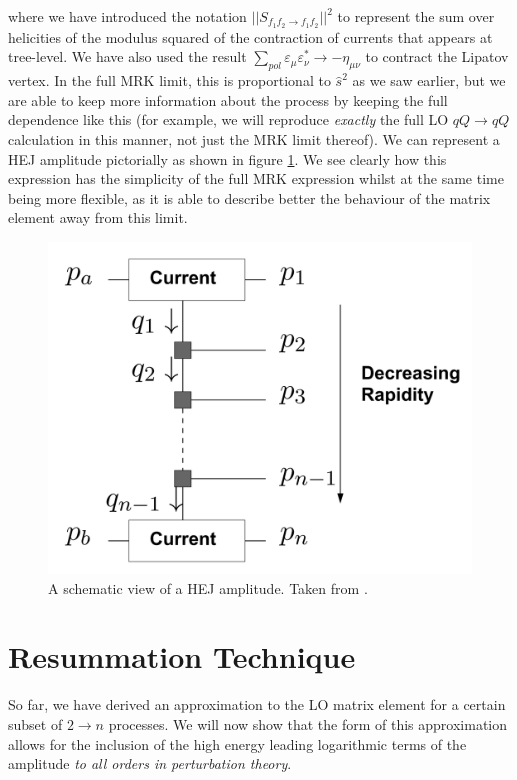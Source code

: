 where we have introduced the notation $||S_{f_1 f_2 \to f_1 f_2}||^2$ to represent the sum over helicities of the modulus squared of the contraction of currents that appears at tree-level. We have also used the result $\sum_{pol} \varepsilon_{\mu} \varepsilon_{\nu}^* \to -\eta_{\mu \nu}$ to contract the Lipatov vertex. In the full MRK limit, this is proportional to $\hat{s}^2$ as we saw earlier, but we are able to keep more information about the process by keeping the full dependence like this (for example, we will reproduce \emph{exactly} the full LO $qQ \to qQ$ calculation in this manner, not just the MRK limit thereof). We can represent a HEJ amplitude pictorially as shown in figure \ref{fig:hejamp}. We see clearly how this expression has the simplicity of the full MRK expression whilst at the same time being more flexible, as it is able to describe better the behaviour of the matrix element away from this limit. %

\begin{figure}[t]
\centering
\includegraphics[scale=0.35]{Images/hej_amp.png} 
\caption{A schematic view of a HEJ amplitude. Taken from \cite{Andersen2011a}.}
\label{fig:hejamp}
\end{figure}

\section{Resummation Technique}

So far, we have derived an approximation to the LO matrix element for a certain subset of $2 \to n$ processes. We will now show that the form of this approximation allows for the inclusion of the high energy leading logarithmic terms of the amplitude \emph{to all orders in perturbation theory}. 

